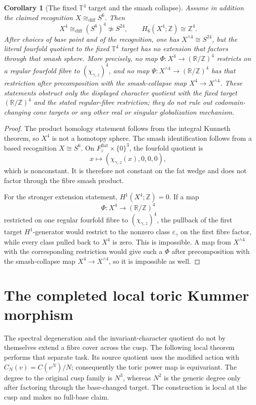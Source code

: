 \documentclass[11pt]{article}
\numberwithin{equation}{section}
\newtheorem{corollary}[theorem]{Corollary}
\theoremstyle{definition}
\theoremstyle{remark}
\newcommand{\R}{\mathbb R}
\newcommand{\Z}{\mathbb Z}
\begin{document}
\begin{corollary}[The fixed $\mathbb T^4$ target and the smash collapse]
\label{cor:product-smash-obstruction}
Assume in addition the claimed recognition $X\cong_{\mathrm{diff}}S^6$.
Then
\[
 X^4\cong_{\mathrm{diff}}(S^6)^4\not\simeq S^{24},
 \qquad H_6(X^4;\Z)\cong\Z^4.
\]
After choices of base point and of the recognition, one has
$X^{\wedge4}\cong S^{24}$, but the literal fourfold quotient to the fixed
$\mathbb T^4$ target has no extension that factors through that smash
sphere.  More precisely, no map
$\Phi:X^4\to(\R/\Z)^4$ restricts on a regular fourfold fibre to
$(\chi_{\gamma,z})^4$, and no map
$\Psi:X^{\wedge4}\to(\R/\Z)^4$ has that restriction after precomposition
with the smash-collapse map $X^4\to X^{\wedge4}$.
These statements obstruct only the displayed character quotient with the
fixed target $(\R/\Z)^4$ and the stated regular-fibre restriction; they do
not rule out codomain-changing cone targets or any other real or singular
globalization mechanism.
\end{corollary}

\begin{proof}
The product homology statement follows from the integral Kunneth theorem, so
$X^4$ is not a homotopy sphere.  The smash identification follows from a
based recognition $X\cong S^6$.  On
$F_z^{\mathrm{flat}}\times\{0\}^3$, the fourfold quotient is
\[
 x\longmapsto(\chi_{\gamma,z}(x),0,0,0),
\]
which is nonconstant.  It is therefore not constant on the fat wedge and
does not factor through the fibre smash product.

For the stronger extension statement, $H^1(X^4;\Z)=0$.  If a map
\[
 \Phi:X^4\longrightarrow(\R/\Z)^4
\]
restricted on one regular fourfold fibre to
$(\chi_{\gamma,z})^4$, the pullback of the
first target $H^1$-generator would restrict to the nonzero class
$\varepsilon_\gamma$ on the first fibre factor, while every class pulled
back to $X^4$ is zero.  This is impossible.  A map from $X^{\wedge4}$ with
the corresponding restriction would give such a $\Phi$ after precomposition
with the smash-collapse map $X^4\to X^{\wedge4}$, so it is impossible as
well.
\end{proof}

\section{The completed local toric Kummer morphism}

The spectral degeneration and the invariant-character quotient do not by
themselves extend a fibre cover across the cusp.  The following local theorem
performs that separate task.  Its source quotient uses the modified action
with $C_N(v)=C(v^N)/N$; consequently the toric power map is equivariant.
The degree to the original cusp family is $N^3$, whereas $N^2$ is the generic
degree only after factoring through the base-changed target.  The construction
is local at the cusp and makes no full-base claim.
\end{document}
